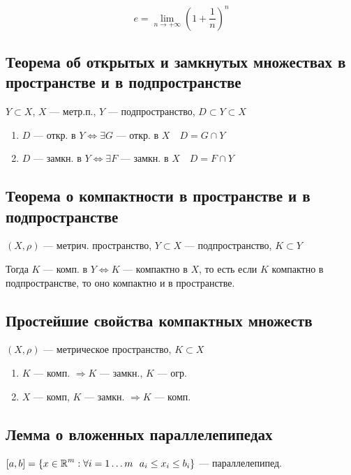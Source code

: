 $$e=\lim\limits_{n\to+\infty}\left(1+\frac{1}{n}\right)^n$$

\subsection{Теорема об открытых и замкнутых множествах в пространстве и в подпространстве}

$Y\subset X$, $X$ --- метр.п., $Y$ --- подпространство, $D\subset Y\subset X$

\begin{enumerate}
    \item $D$ --- откр. в $Y \Leftrightarrow \exists G$ --- откр. в $X \quad D=G\cap Y$
    \item $D$ --- замкн. в $Y \Leftrightarrow \exists F$ --- замкн. в $X \quad D=F\cap Y$
\end{enumerate}

\subsection{Теорема о компактности в пространстве и в подпространстве}

$(X,\rho)$ --- метрич. пространство, $Y\subset X$ --- подпространство, $K\subset Y$

Тогда $K$ --- комп. в $Y \Leftrightarrow K$ --- компактно в $X$, то есть если $K$ компактно в подпространстве, то оно компактно и в пространстве.

\subsection{Простейшие свойства компактных множеств}

$(X, \rho)$ --- метрическое пространство, $K\subset X$

\begin{enumerate}
    \item $K$ --- комп. $\Rightarrow K$ --- замкн., $K$ --- огр.
    \item $X$ --- комп, $K$ --- замкн. $\Rightarrow K$ --- комп. 
\end{enumerate}

\subsection{Лемма о вложенных параллелепипедах}

$[a, b] = \{x\in\R^m: \forall i=1\ldots m \ \ a_i\leq x_i\leq b_i\}$ --- параллелепипед.

